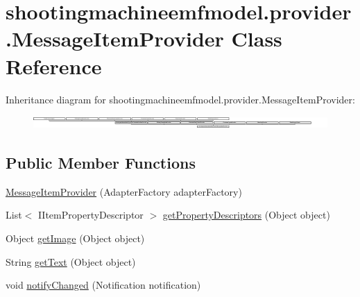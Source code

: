 \hypertarget{classshootingmachineemfmodel_1_1provider_1_1_message_item_provider}{\section{shootingmachineemfmodel.\-provider.\-Message\-Item\-Provider Class Reference}
\label{classshootingmachineemfmodel_1_1provider_1_1_message_item_provider}
}
Inheritance diagram for shootingmachineemfmodel.\-provider.\-Message\-Item\-Provider\-:\begin{figure}[H]
\begin{center}
\leavevmode
\includegraphics[height=0.499109cm]{classshootingmachineemfmodel_1_1provider_1_1_message_item_provider}
\end{center}
\end{figure}
\subsection*{Public Member Functions}
\begin{DoxyCompactItemize}
\item 
\hyperlink{classshootingmachineemfmodel_1_1provider_1_1_message_item_provider_ab38549aad1628f5b04dbd16e7f4576d4}{Message\-Item\-Provider} (Adapter\-Factory adapter\-Factory)
\item 
List$<$ I\-Item\-Property\-Descriptor $>$ \hyperlink{classshootingmachineemfmodel_1_1provider_1_1_message_item_provider_a8efd2cd052063fdffd7c7f80fb8d2a8d}{get\-Property\-Descriptors} (Object object)
\item 
Object \hyperlink{classshootingmachineemfmodel_1_1provider_1_1_message_item_provider_a656209bea043eb24113ade54bf739f21}{get\-Image} (Object object)
\item 
String \hyperlink{classshootingmachineemfmodel_1_1provider_1_1_message_item_provider_acab3f54502f64337348cec50af08be39}{get\-Text} (Object object)
\item 
void \hyperlink{classshootingmachineemfmodel_1_1provider_1_1_message_item_provider_ad630a656bc04ab9b837c5f70d3ccaca7}{notify\-Changed} (Notification notification)
\end{DoxyCompactItemize}
